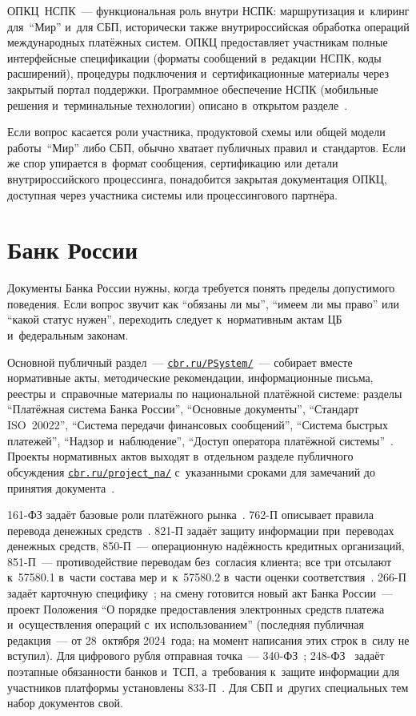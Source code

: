 ОПКЦ~НСПК~--- функциональная роль
внутри НСПК: маршрутизация и~клиринг для~\enquote{Мир} и~для СБП, исторически
также внутрироссийская обработка операций международных платёжных систем.
ОПКЦ предоставляет участникам полные интерфейсные спецификации (форматы
сообщений в~редакции НСПК, коды расширений), процедуры подключения
и~сертификационные материалы через закрытый портал поддержки. Программное
обеспечение НСПК (мобильные решения и~терминальные технологии) описано
в~открытом разделе~\cite{nspk-tsp}.

Если вопрос касается роли участника, продуктовой схемы или общей модели
работы~\enquote{Мир} либо СБП, обычно хватает публичных правил и~стандартов.
Если же спор упирается в~формат сообщения, сертификацию или детали
внутрироссийского процессинга, понадобится закрытая документация ОПКЦ, доступная через
участника системы или процессингового партнёра.

\section*{Банк России}\label{sec:ps-cbr}

Документы Банка России нужны, когда требуется понять пределы допустимого
поведения. Если вопрос звучит как \enquote{обязаны ли мы}, \enquote{имеем ли мы
право} или \enquote{какой статус нужен}, переходить следует к~нормативным актам
ЦБ и~федеральным законам.

Основной публичный раздел~---
\href{https://www.cbr.ru/PSystem/}{\texttt{cbr.ru/PSystem/}}~--- собирает
вместе нормативные акты, методические рекомендации, информационные письма,
реестры и~справочные материалы по национальной платёжной системе: разделы
\enquote{Платёжная система Банка России}, \enquote{Основные документы},
\enquote{Стандарт ISO~20022}, \enquote{Система передачи финансовых сообщений},
\enquote{Система быстрых платежей}, \enquote{Надзор и~наблюдение},
\enquote{Доступ оператора платёжной системы}~\cite{cbr-ps}. Проекты нормативных
актов выходят в~отдельном разделе публичного обсуждения
\href{https://www.cbr.ru/project_na/}{\texttt{cbr.ru/project\_na/}}
с~указанными сроками для замечаний до принятия документа~\cite{cbr-project-na}.

161-ФЗ задаёт базовые роли платёжного рынка~\cite{fz-161}. 762-П описывает
правила перевода денежных средств~\cite{cbr-762p}. 821-П задаёт защиту
информации при~переводах денежных средств, 850-П~--- операционную надёжность
кредитных организаций, \mbox{851-П}~--- противодействие переводам без~согласия
клиента; все три отсылают к~57580.1 в~части состава мер и~к~57580.2 в~части
оценки соответствия~\cite{cbr-821p,cbr-850p,cbr-851p}. 266-П задаёт
карточную специфику~\cite{cbr-266p}; на смену готовится новый акт Банка
России~--- проект Положения \enquote{О порядке предоставления электронных
средств платежа и~осуществления операций с~их использованием} (последняя
  публичная редакция~--- от 28~октября 2024~года; на момент написания этих строк
в~силу не вступил). Для цифрового рубля отправная точка~---
340-ФЗ~\cite{fz-340}; 248-ФЗ~\cite{fz-248} задаёт поэтапные обязанности
банков и~ТСП, а~требования к~защите информации для участников платформы
установлены 833-П~\cite{cbr-833p}. Для СБП и~других специальных тем набор
документов свой.

